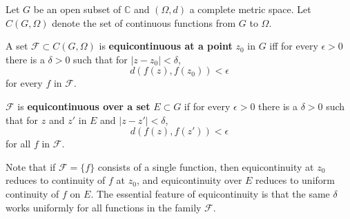 Let \(G\) be an open subset of \(\mathbb{C}\) and \((\Omega, d)\) a complete metric space. Let \(C(G, \Omega)\) denote the set of continuous functions from \(G\) to \(\Omega\).

A set \(\mathcal{F} \subset C(G, \Omega)\) is \textbf{equicontinuous at a point} \(z_0\) in \(G\) iff for every \(\epsilon > 0\) there is a \(\delta > 0\) such that for \(|z - z_0| < \delta\),
\[
d(f(z), f(z_0)) < \epsilon
\]
for every \(f\) in \(\mathcal{F}\).

\(\mathcal{F}\) is \textbf{equicontinuous over a set} \(E \subset G\) if for every \(\epsilon > 0\) there is a \(\delta > 0\) such that for \(z\) and \(z'\) in \(E\) and \(|z - z'| < \delta\),
\[
d(f(z), f(z')) < \epsilon
\]
for all \(f\) in \(\mathcal{F}\).

Note that if \(\mathcal{F} = \{f\}\) consists of a single function, then equicontinuity at \(z_0\) reduces to continuity of \(f\) at \(z_0\), and equicontinuity over \(E\) reduces to uniform continuity of \(f\) on \(E\). The essential feature of equicontinuity is that the same \(\delta\) works uniformly for all functions in the family \(\mathcal{F}\).

